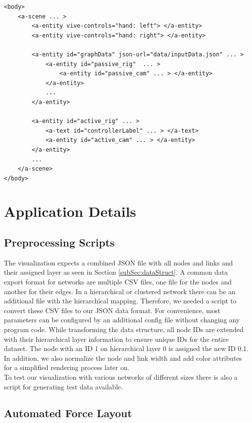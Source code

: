\begin{lstlisting}[label={lst:virtualSceneGraph},caption=Simplified virtual A-Frame scene graph used by the application.]
<body>
    <a-scene ... >
        <a-entity vive-controls="hand: left"> </a-entity>
        <a-entity vive-controls="hand: right"> </a-entity>
        
        <a-entity id="graphData" json-url="data/inputData.json" ... >
            <a-entity id="passive_rig"  ... >  
                <a-entity id="passive_cam" ... > </a-entity>
            </a-entity>
            ...
        </a-entity>

        <a-entity id="active_rig" ... >
            <a-text id="controllerLabel" ... > </a-text>
            <a-entity id="active_cam" ... > </a-entity>
        </a-entity>
        ...
    </a-scene>
</body>
\end{lstlisting}

\section{Application Details}
\label{sec:applDetails}
\subsection{Preprocessing Scripts}
\label{sec:preprocessing}

The visualization expects a combined JSON file with all nodes and links and their assigned layer as seen in Section \ref{subSec:dataStruct}.
A common data export format for networks are multiple CSV files, one file for the nodes and another for their edges.
In a hierarchical or clustered network there can be an additional file with the hierarchical mapping.
Therefore, we needed a script to convert these CSV files to our JSON data format. For convenience, most parameters can be configured by an additional config file without changing any program code. 
While transforming the data structure, all node IDs are extended with their hierarchical layer information to ensure unique IDs for the entire dataset. The node with an ID 1 on hierarchical layer 0 is assigned the new ID 0.1.  
In addition, we also normalize the node and link width and add color attributes for a simplified rendering process later on.\\
To test our visualization with various networks of different sizes there is also a script for generating test data available.

\subsection{Automated Force Layout}
\label{sec:layoutCalculation}

